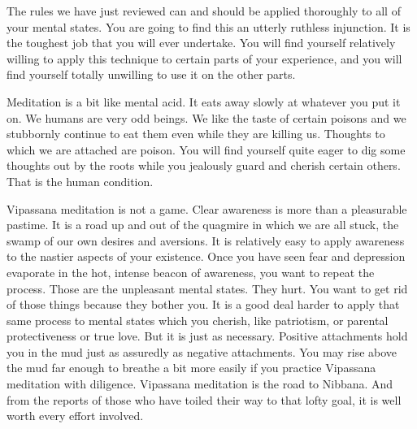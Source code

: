 The rules we have just reviewed can and should be applied thoroughly to all of
your mental states. You are going to find this an utterly ruthless injunction.
It is the toughest job that you will ever undertake. You will find yourself
relatively willing to apply this technique to certain parts of your experience,
and you will find yourself totally unwilling to use it on the other parts.

Meditation is a bit like mental acid. It eats away slowly at whatever you put it
on. We humans are very odd beings. We like the taste of certain poisons and we
stubbornly continue to eat them even while they are killing us. Thoughts to
which we are attached are poison. You will find yourself quite eager to dig some
thoughts out by the roots while you jealously guard and cherish certain others.
That is the human condition.

Vipassana meditation is not a game. Clear awareness is more than a pleasurable
pastime. It is a road up and out of the quagmire in which we are all stuck, the
swamp of our own desires and aversions. It is relatively easy to apply awareness
to the nastier aspects of your existence. Once you have seen fear and depression
evaporate in the hot, intense beacon of awareness, you want to repeat the
process. Those are the unpleasant mental states. They hurt. You want to get rid
of those things because they bother you. It is a good deal harder to apply that
same process to mental states which you cherish, like patriotism, or parental
protectiveness or true love. But it is just as necessary. Positive attachments
hold you in the mud just as assuredly as negative attachments. You may rise
above the mud far enough to breathe a bit more easily if you practice Vipassana
meditation with diligence. Vipassana meditation is the road to Nibbana. And from
the reports of those who have toiled their way to that lofty goal, it is well
worth every effort involved.
